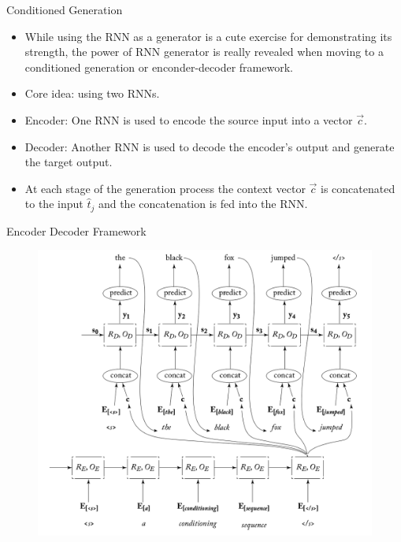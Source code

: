 \documentclass[handout]{beamer}
\begin{document}
\begin{frame}{Conditioned Generation}
\begin{scriptsize}
\begin{itemize}
\item While using the RNN as a generator is a cute exercise for demonstrating its strength, the power of RNN generator is really revealed when moving to a conditioned generation or enconder-decoder framework.
\item Core idea: using two RNNs.
\item Encoder: One RNN is used to encode the source input into a vector $\overrightarrow{c}$.
\item Decoder: Another RNN is used to decode the encoder's output and generate the target output.
\item At each stage of the generation process the context vector $\overrightarrow{c}$ is concatenated to the input $\hat{t}_j$ and the concatenation is fed into the RNN.
\end{itemize}
\end{scriptsize}
\end{frame}


\begin{frame}{Encoder Decoder Framework}
         \begin{figure}[h]
        	\includegraphics[scale = 0.32]{pics/seqseq.png}
        \end{figure}  
\end{frame}
\end{document}
